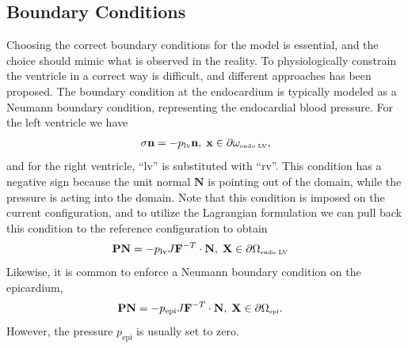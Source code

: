 \subsection{Boundary Conditions}
\label{sec:mech_boudary}


Choosing the correct boundary conditions for the model is essential,
and the choice should mimic what is observed in the reality. To
physiologically constrain the ventricle in a correct way is difficult,
and different approaches has been proposed.
The boundary condition at the endocardium is typically modeled as a
Neumann boundary condition, representing the endocardial blood
pressure. For the left ventricle we have
\begin{align}
  \sigma \mathbf{n} = -p_{\mathrm{lv}} \mathbf{n}, \;  \mathbf{x} \in  \partial \omega_{ \textnormal{\tiny \text{endo LV}}}, 
\end{align}
and for the right ventricle, ``lv'' is substituted with ``rv''.
This condition has a negative sign because the unit normal
$\mathbf{N}$ is pointing out of the domain, while the pressure is
acting into the domain. 
Note that this condition is imposed on the current configuration, and
to utilize the Lagrangian formulation we can pull back this condition
to the reference configuration to obtain
\begin{align}
  \mathbf{P}\mathbf{N} &= -p_{\mathrm{lv}} J\mathbf{F}^{-T} \cdot \mathbf{N}, \;  \mathbf{X} \in \partial \Omega_{ \textnormal{\tiny \text{endo LV}}}
\end{align}
Likewise, it is common to enforce a
Neumann boundary condition on the epicardium,
\begin{align}
\mathbf{P}\mathbf{N}  &= -p_{\mathrm{epi}}  J\mathbf{F}^{-T} \cdot \mathbf{N}, \;  \mathbf{X} \in \partial \Omega_{ \textnormal{\tiny \text{epi}}}.
\end{align}
However, the pressure $p_{\mathrm{epi}}$ is usually set
to zero.

